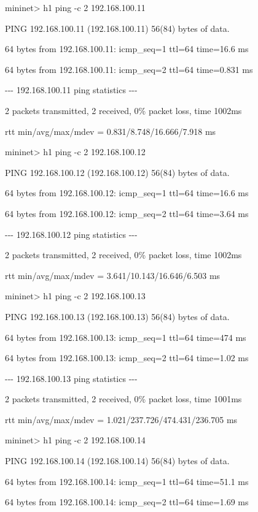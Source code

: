 mininet{\textgreater} h1 ping -c 2 192.168.100.11

PING 192.168.100.11 (192.168.100.11) 56(84) bytes of data.

64 bytes from 192.168.100.11: icmp\_seq=1 ttl=64 time=16.6 ms

64 bytes from 192.168.100.11: icmp\_seq=2 ttl=64 time=0.831 ms


\bigskip

{}-{}-{}- 192.168.100.11 ping statistics -{}-{}-

2 packets transmitted, 2 received, 0\% packet loss, time 1002ms

rtt min/avg/max/mdev = 0.831/8.748/16.666/7.918 ms

mininet{\textgreater} h1 ping -c 2 192.168.100.12

PING 192.168.100.12 (192.168.100.12) 56(84) bytes of data.

64 bytes from 192.168.100.12: icmp\_seq=1 ttl=64 time=16.6 ms

64 bytes from 192.168.100.12: icmp\_seq=2 ttl=64 time=3.64 ms


\bigskip

{}-{}-{}- 192.168.100.12 ping statistics -{}-{}-

2 packets transmitted, 2 received, 0\% packet loss, time 1002ms

rtt min/avg/max/mdev = 3.641/10.143/16.646/6.503 ms

mininet{\textgreater} h1 ping -c 2 192.168.100.13

PING 192.168.100.13 (192.168.100.13) 56(84) bytes of data.

64 bytes from 192.168.100.13: icmp\_seq=1 ttl=64 time=474 ms

64 bytes from 192.168.100.13: icmp\_seq=2 ttl=64 time=1.02 ms


\bigskip

{}-{}-{}- 192.168.100.13 ping statistics -{}-{}-

2 packets transmitted, 2 received, 0\% packet loss, time 1001ms

rtt min/avg/max/mdev = 1.021/237.726/474.431/236.705 ms

mininet{\textgreater} h1 ping -c 2 192.168.100.14

PING 192.168.100.14 (192.168.100.14) 56(84) bytes of data.

64 bytes from 192.168.100.14: icmp\_seq=1 ttl=64 time=51.1 ms

64 bytes from 192.168.100.14: icmp\_seq=2 ttl=64 time=1.69 ms


